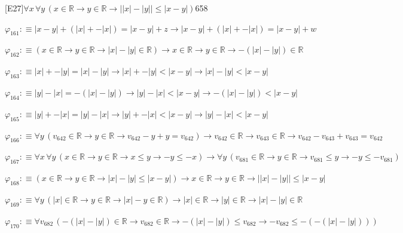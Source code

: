 \begin{fullproof}{[E27]}{$\forall x\,\forall y\,(x \in \mathbb{R} \to y \in \mathbb{R} \to \lvert \lvert x \rvert - \lvert y \rvert \rvert \leq \lvert x - y \rvert)$}{658}
\begin{abbrevlist}
\item $\varphi_{161} :\equiv \lvert x - y \rvert + (\lvert x \rvert + -\lvert x \rvert) = \lvert x - y \rvert + z \to \lvert x - y \rvert + (\lvert x \rvert + -\lvert x \rvert) = \lvert x - y \rvert + w$
\item $\varphi_{162} :\equiv (x \in \mathbb{R} \to y \in \mathbb{R} \to \lvert x \rvert - \lvert y \rvert \in \mathbb{R}) \to x \in \mathbb{R} \to y \in \mathbb{R} \to -(\lvert x \rvert - \lvert y \rvert) \in \mathbb{R}$
\item $\varphi_{163} :\equiv \lvert x \rvert + -\lvert y \rvert = \lvert x \rvert - \lvert y \rvert \to \lvert x \rvert + -\lvert y \rvert < \lvert x - y \rvert \to \lvert x \rvert - \lvert y \rvert < \lvert x - y \rvert$
\item $\varphi_{164} :\equiv \lvert y \rvert - \lvert x \rvert = -(\lvert x \rvert - \lvert y \rvert) \to \lvert y \rvert - \lvert x \rvert < \lvert x - y \rvert \to -(\lvert x \rvert - \lvert y \rvert) < \lvert x - y \rvert$
\item $\varphi_{165} :\equiv \lvert y \rvert + -\lvert x \rvert = \lvert y \rvert - \lvert x \rvert \to \lvert y \rvert + -\lvert x \rvert < \lvert x - y \rvert \to \lvert y \rvert - \lvert x \rvert < \lvert x - y \rvert$
\item $\varphi_{166} :\equiv \forall y\,(v_{642} \in \mathbb{R} \to y \in \mathbb{R} \to v_{642} - y + y = v_{642}) \to v_{642} \in \mathbb{R} \to v_{643} \in \mathbb{R} \to v_{642} - v_{643} + v_{643} = v_{642}$
\item $\varphi_{167} :\equiv \forall x\,\forall y\,(x \in \mathbb{R} \to y \in \mathbb{R} \to x \leq y \to -y \leq -x) \to \forall y\,(v_{681} \in \mathbb{R} \to y \in \mathbb{R} \to v_{681} \leq y \to -y \leq -v_{681})$
\item $\varphi_{168} :\equiv (x \in \mathbb{R} \to y \in \mathbb{R} \to \lvert x \rvert - \lvert y \rvert \leq \lvert x - y \rvert) \to x \in \mathbb{R} \to y \in \mathbb{R} \to \lvert \lvert x \rvert - \lvert y \rvert \rvert \leq \lvert x - y \rvert$
\item $\varphi_{169} :\equiv \forall y\,(\lvert x \rvert \in \mathbb{R} \to y \in \mathbb{R} \to \lvert x \rvert - y \in \mathbb{R}) \to \lvert x \rvert \in \mathbb{R} \to \lvert y \rvert \in \mathbb{R} \to \lvert x \rvert - \lvert y \rvert \in \mathbb{R}$
\item $\varphi_{170} :\equiv \forall v_{682}\,(-(\lvert x \rvert - \lvert y \rvert) \in \mathbb{R} \to v_{682} \in \mathbb{R} \to -(\lvert x \rvert - \lvert y \rvert) \leq v_{682} \to -v_{682} \leq -(-(\lvert x \rvert - \lvert y \rvert)))$

\end{abbrevlist}
\end{fullproof}
